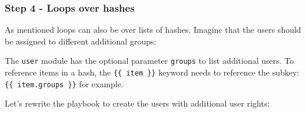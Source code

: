 \hypertarget{step-4---loops-over-hashes}{%
\subsubsection{Step 4 - Loops over
hashes}\label{step-4---loops-over-hashes}}

As mentioned loops can also be over lists of hashes. Imagine that the
users should be assigned to different additional groups:

\begin{Shaded}
\begin{Highlighting}[]
\KeywordTok{{-}}\AttributeTok{ }\KeywordTok{:}
\AttributeTok{  }\KeywordTok{:}
\KeywordTok{{-}}\AttributeTok{ }\KeywordTok{:}
\AttributeTok{  }\KeywordTok{:}
\KeywordTok{{-}}\AttributeTok{ }\KeywordTok{:}
\AttributeTok{  }\KeywordTok{:}
\end{Highlighting}
\end{Shaded}

The \texttt{user} module has the optional parameter \texttt{groups} to
list additional users. To reference items in a hash, the
\texttt{\{\{\ item\ \}\}} keyword needs to reference the subkey:
\texttt{\{\{\ item.groups\ \}\}} for example.

Let's rewrite the playbook to create the users with additional user
rights:

